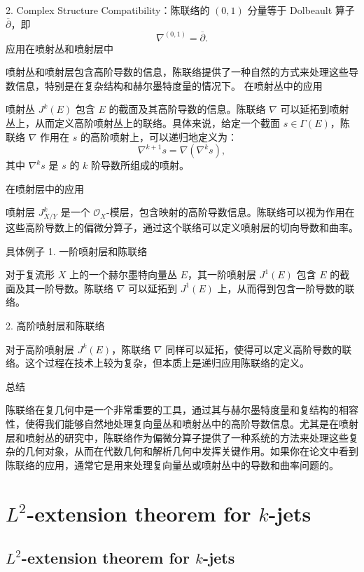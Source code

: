 \documentclass[lang=cn,12pt,fontset=none,a4paper]{beautybook}
\begin{document}
2. Complex Structure Compatibility：陈联络的 $(0,1)$ 分量等于 Dolbeault 算子 $\overline{\partial}$，即
   $$
   \nabla^{(0,1)} = \overline{\partial}.
   $$
应用在喷射丛和喷射层中

喷射丛和喷射层包含高阶导数的信息，陈联络提供了一种自然的方式来处理这些导数信息，特别是在复杂结构和赫尔墨特度量的情况下。
在喷射丛中的应用

喷射丛 $J^k(E)$ 包含 $E$ 的截面及其高阶导数的信息。陈联络 $\nabla$ 可以延拓到喷射丛上，从而定义高阶喷射丛上的联络。具体来说，给定一个截面 $s \in \Gamma(E)$，陈联络 $\nabla$ 作用在 $s$ 的高阶喷射上，可以递归地定义为：
$$
\nabla^{k+1} s = \nabla (\nabla^k s),
$$
其中 $\nabla^k s$ 是 $s$ 的 $k$ 阶导数所组成的喷射。

在喷射层中的应用

喷射层 $J^k_{X/Y}$ 是一个 $\mathcal{O}_X$-模层，包含映射的高阶导数信息。陈联络可以视为作用在这些高阶导数上的偏微分算子，通过这个联络可以定义喷射层的切向导数和曲率。

具体例子
1. 一阶喷射层和陈联络

对于复流形 $X$ 上的一个赫尔墨特向量丛 $E$，其一阶喷射层 $J^1(E)$ 包含 $E$ 的截面及其一阶导数。陈联络 $\nabla$ 可以延拓到 $J^1(E)$ 上，从而得到包含一阶导数的联络。

2. 高阶喷射层和陈联络

对于高阶喷射层 $J^k(E)$，陈联络 $\nabla$ 同样可以延拓，使得可以定义高阶导数的联络。这个过程在技术上较为复杂，但本质上是递归应用陈联络的定义。

总结

陈联络在复几何中是一个非常重要的工具，通过其与赫尔墨特度量和复结构的相容性，使得我们能够自然地处理复向量丛和喷射丛中的高阶导数信息。尤其是在喷射层和喷射丛的研究中，陈联络作为偏微分算子提供了一种系统的方法来处理这些复杂的几何对象，从而在代数几何和解析几何中发挥关键作用。如果你在论文中看到陈联络的应用，通常它是用来处理复向量丛或喷射丛中的导数和曲率问题的。

\part{\texorpdfstring{$L^2$}{}-extension theorem for \texorpdfstring{$k$}{}-jets }
\chapter{\texorpdfstring{$L^2$}{}-extension theorem for \texorpdfstring{$k$}{}-jets }
\end{document}
